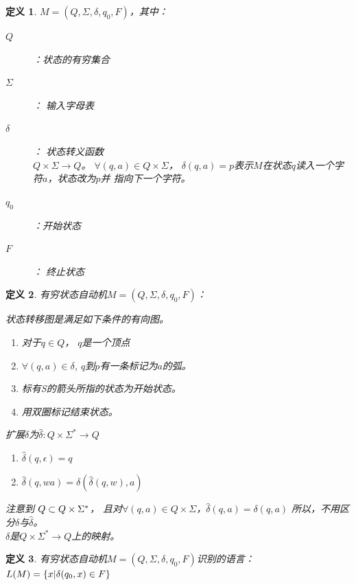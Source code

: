 \documentclass{ctexart}
\newtheorem{definition}{定义}[section]
\DeclarePairedDelimiter{\set}{\{}{\}}
\begin{document}
\begin{definition}
    $M = (Q, \Sigma, \delta, q_0, F)$，其中：

    \begin{description}
        \item[$Q$]：状态的有穷集合
        \item[$\Sigma$]： 输入字母表
        \item[$\delta$]： 状态转义函数\\
            $Q\times\Sigma \to Q$。 $\forall (q,a) \in Q\times\Sigma$，
            $\delta(q,a) = p$表示$M$在状态$q$读入一个字符$a$，状态改为$p$并
            指向下一个字符。
        \item[$q_0$]：开始状态
        \item[$F$]： 终止状态 
    \end{description}
\end{definition}
\begin{definition}
    有穷状态自动机$M = (Q, \Sigma, \delta, q_0, F)$：

    状态转移图是满足如下条件的有向图。
    \begin{enumerate}
        \item 对于$q \in Q$， $q$是一个顶点
        \item $\forall (q,a) \in \delta$, $q$到$p$有一条标记为$a$的弧。
        \item 标有S的箭头所指的状态为开始状态。
        \item 用双圈标记结束状态。
    \end{enumerate}

    扩展$\delta$为$\hat{\delta}: Q \times \Sigma^* \to Q$
    \begin{enumerate}
        \item $\hat{\delta}(q,\epsilon) = q$
        \item $\hat{\delta}(q, wa) = \delta(\hat{\delta}(q,w), a)$
    \end{enumerate}
    注意到 $Q \time \Sigma \subset Q \times \Sigma^*$，
    且对$\forall (q, a) \in Q \times \Sigma$，$\hat{\delta}(q, a) = \delta(q, a)$
    所以，不用区分$\delta$与$\hat{\delta}$。 \\
    $\delta$是$Q \times \Sigma^* \to Q$上的映射。
\end{definition}

\begin{definition}
    有穷状态自动机$M = (Q, \Sigma, \delta, q_0, F)$识别的语言：
    $L(M) = \set*{x | \delta(q_0, x) \in F}$
\end{definition}
\end{document}
